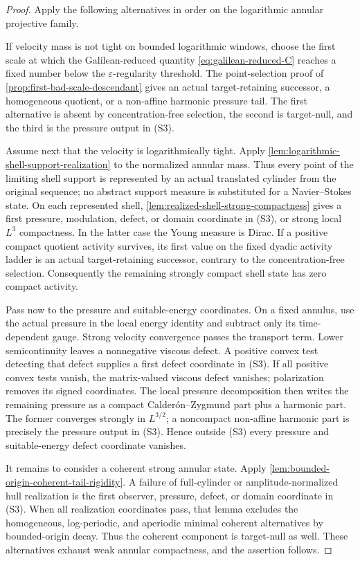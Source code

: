 \documentclass[11pt]{amsart}
\numberwithin{equation}{section}
\theoremstyle{plain}
\theoremstyle{definition}
\theoremstyle{remark}
\begin{document}
\begin{proof}
Apply the following alternatives in order on the logarithmic annular
projective family.

If velocity mass is not tight on bounded logarithmic windows, choose the
first scale at which the Galilean-reduced quantity
\eqref{eq:galilean-reduced-C} reaches a fixed number below the
\(\varepsilon\)-regularity threshold.  The point-selection proof of
\cref{prop:first-bad-scale-descendant} gives an actual target-retaining
successor, a homogeneous quotient, or a non-affine harmonic pressure tail.
The first alternative is absent by concentration-free selection, the second
is target-null, and the third is the pressure output in \textup{(S3)}.

Assume next that the velocity is logarithmically tight.  Apply
\cref{lem:logarithmic-shell-support-realization} to the normalized annular
mass.  Thus every point of the limiting shell support is represented by an
actual translated cylinder from the original sequence; no abstract support
measure is substituted for a Navier--Stokes state.  On each represented shell,
\cref{lem:realized-shell-strong-compactness} gives a first pressure,
modulation, defect, or domain coordinate in \textup{(S3)}, or strong local
\(L^3\) compactness.  In the latter case the Young measure is Dirac.  If a
positive compact quotient activity survives, its first value on the fixed
dyadic activity ladder is an actual target-retaining successor, contrary to
the concentration-free selection.  Consequently the remaining strongly
compact shell state has zero compact activity.

Pass now to the pressure and suitable-energy coordinates.  On a fixed
annulus, use the actual pressure in the local energy identity and subtract
only its time-dependent gauge.  Strong velocity convergence passes the
transport term.  Lower semicontinuity leaves a nonnegative viscous defect.  A
positive convex test detecting that defect supplies a first defect coordinate
in \textup{(S3)}.  If all positive convex tests vanish, the matrix-valued
viscous defect vanishes; polarization removes its signed coordinates.  The
local pressure decomposition then writes the remaining pressure as a compact
Calder\'on--Zygmund part plus a harmonic part.  The former converges strongly
in \(L^{3/2}\); a noncompact non-affine harmonic part is precisely the
pressure output in \textup{(S3)}.  Hence outside \textup{(S3)} every pressure
and suitable-energy defect coordinate vanishes.

It remains to consider a coherent strong annular state.  Apply
\cref{lem:bounded-origin-coherent-tail-rigidity}.  A failure of full-cylinder
or amplitude-normalized hull realization is the first observer, pressure,
defect, or domain coordinate in \textup{(S3)}.  When all realization
coordinates pass, that lemma excludes the homogeneous, log-periodic, and
aperiodic minimal coherent alternatives by bounded-origin decay.  Thus the
coherent component is target-null as well.  These alternatives exhaust weak
annular compactness, and the assertion follows.
\end{proof}
\end{document}
